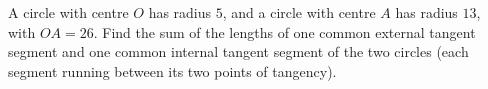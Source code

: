 A circle with centre $O$ has radius $5$, and a circle with centre $A$ has radius $13$, with $OA=26$. Find the sum of the lengths of one common external tangent segment and one common internal tangent segment of the two circles (each segment running between its two points of tangency).
